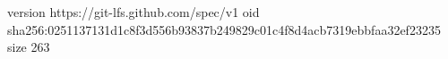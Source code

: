 version https://git-lfs.github.com/spec/v1
oid sha256:0251137131d1c8f3d556b93837b249829c01c4f8d4acb7319ebbfaa32ef23235
size 263
